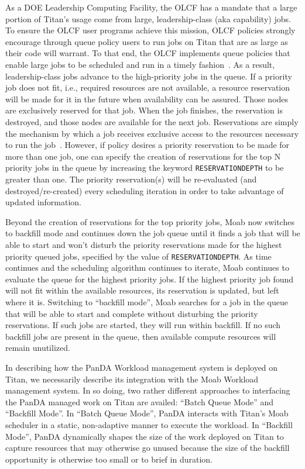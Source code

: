 As a DOE Leadership
Computing Facility, the OLCF has a mandate that a large portion of Titan's
usage come from large, leadership-class (aka capability) jobs. To ensure the
OLCF user programs achieve this mission, OLCF policies strongly encourage
through queue policy users to run jobs on Titan that are as large as their
code will warrant. To that end, the OLCF implements queue policies that enable
large jobs to be scheduled and run in a timely fashion~\cite{titan_sched}. 
As a result, leadership-class jobs advance to the high-priority jobs in the
queue. If a priority job does not fit, i.e., required resources are not
available, a resource reservation will be made for it in the future when
availability can be assured. Those nodes are exclusively reserved for that
job. When the job finishes, the reservation is destroyed, and those nodes are
available for the next job. Reservations are simply the mechanism by which a
job receives exclusive access to the resources necessary to run the
job~\cite{osti_1086656}. However, if policy desires a priority reservation to
be made for more than one job, one can specify the creation of reservations
for the top N priority jobs in the queue by increasing the keyword
\texttt{RESERVATIONDEPTH} to be greater than one.  The priority reservation(s)
will be re-evaluated (and destroyed/re-created) every scheduling iteration in
order to take advantage of updated information.

Beyond the creation of reservations for the top priority jobs, Moab now
switches to backfill mode and continues down the job queue until it finds a
job that will be able to start and won't disturb the priority reservations
made for the highest priority queued jobs, specified by the value of
\texttt{RESERVATIONDEPTH}. As time continues and the scheduling algorithm
continues to iterate, Moab continues to evaluate the queue for the highest
priority jobs. If the highest priority job found will not fit within the
available resources, its reservation is updated, but left where it is.
Switching to ``backfill mode'', Moab searches for a job in the queue that will
be able to start and complete without disturbing the priority reservations.
If such jobs are started, they will run within backfill.  If no such backfill
jobs are present in the queue, then available compute resources will remain
unutilized.

In describing how the PanDA Workload management system is deployed on Titan,
we necessarily describe its integration with the Moab Workload management
system. In so doing, two rather different approaches to interfacing the PanDA
managed work on Titan are availed: ``Batch Queue Mode'' and ``Backfill Mode''.
In ``Batch Queue Mode'', PanDA interacts with Titan's Moab scheduler in a
static, non-adaptive manner to execute the workload.  In ``Backfill Mode'',
PanDA  dynamically shapes the size of the work deployed on Titan to capture
resources that may otherwise go unused because the size of the backfill
opportunity is otherwise too small or to brief in duration.

